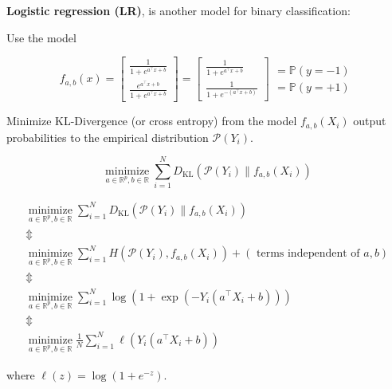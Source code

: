 \documentclass{report}
\begin{document}
\begin{definition}
    \textbf{Logistic regression (LR)}, is another model for binary classification:

    Use the model

    $$
    f_{a, b}(x)=\left[\begin{array}{c}
    \frac{1}{1+e^{a^{\top} x+b}} \\
    \frac{e^{a^{\top} x+b}}{1+e^{a^{\top} x+b}}
    \end{array}\right]=\left[\begin{array}{c}
    \frac{1}{1+e^{a^{\top} x+b}} \\
    \frac{1}{1+e^{-\left(a^{\top} x+b\right)}}
    \end{array}\right]\begin{array}{c}
    = \mathbb{P}(y=-1) \\
    = \mathbb{P}(y=+1)
    \end{array}
    $$

    Minimize KL-Divergence (or cross entropy) from the model $f_{a, b}\left(X_{i}\right)$ output probabilities to the empirical distribution $\mathcal{P}\left(Y_{i}\right)$.

    $$
    \underset{a \in \mathbb{R}^{p}, b \in \mathbb{R}}{\operatorname{minimize}} \sum_{i=1}^{N} D_{\mathrm{KL}}\left(\mathcal{P}\left(Y_{i}\right) \| f_{a, b}\left(X_{i}\right)\right)
    $$
\end{definition}

\begin{concept}
    $$
    \begin{gathered}
    \underset{a \in \mathbb{R}^{p}, b \in \mathbb{R}}{\operatorname{minimize}} \sum_{i=1}^{N} D_{\mathrm{KL}}\left(\mathcal{P}\left(Y_{i}\right) \| f_{a, b}\left(X_{i}\right)\right) \\
    \mathbb{\Updownarrow} \\
    \underset{a \in \mathbb{R}^{p}, b \in \mathbb{R}}{\operatorname{minimize}} \sum_{i=1}^{N} H\left(\mathcal{P}\left(Y_{i}\right), f_{a, b}\left(X_{i}\right)\right)+(\text { terms independent of } a, b) \\
    \mathbb{\Updownarrow} \\
    \underset{a \in \mathbb{R}^{p}, b \in \mathbb{R}}{\operatorname{minimize}} \sum_{i=1}^{N} \log \left(1+\exp \left(-Y_{i}\left(a^{\top} X_{i}+b\right)\right)\right) \\
    \mathbb{\Updownarrow} \\
    \underset{a \in \mathbb{R}^{p}, b \in \mathbb{R}}{\operatorname{minimize}} \frac{1}{N} \sum_{i=1}^{N} \ell\left(Y_{i}\left(a^{\top} X_{i}+b\right)\right)
    \end{gathered}
    $$

    where $\ell(z)=\log \left(1+e^{-z}\right)$.
\end{concept}
\end{document}

